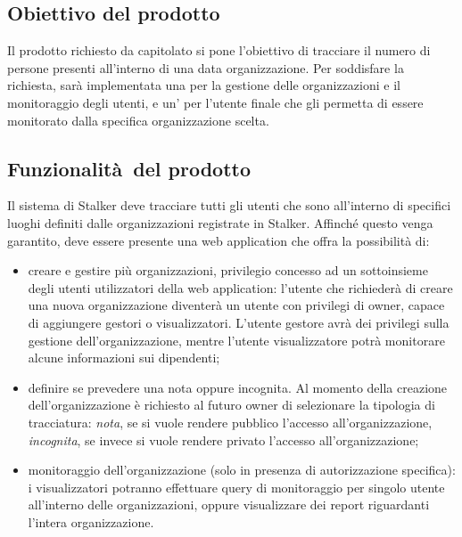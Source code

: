 \documentclass[../manuale-utente.tex]{subfiles}
\begin{document}
\subsection{Obiettivo del prodotto}%
\label{sub:obiettivo_del_prodotto}
Il prodotto richiesto da capitolato si pone l'obiettivo di tracciare il numero di persone presenti all'interno di una data organizzazione. Per soddisfare la richiesta, sarà implementata una  per la gestione delle organizzazioni e il monitoraggio degli utenti, e un' per l'utente finale che gli permetta di essere monitorato dalla specifica organizzazione scelta.


\subsection{Funzionalità del prodotto}%
\label{sub:funzionalita_del_prodotto}
Il sistema di Stalker deve tracciare tutti gli utenti che sono all'interno di specifici luoghi definiti dalle organizzazioni registrate in Stalker.
Affinché questo venga garantito, deve essere presente una web application che offra la possibilità di:
\begin{itemize}
  \item creare e gestire più organizzazioni, privilegio concesso ad un sottoinsieme degli utenti utilizzatori della web application: l'utente che richiederà di creare una nuova organizzazione diventerà un utente con privilegi di owner, capace di aggiungere gestori o visualizzatori. L'utente gestore avrà dei privilegi sulla gestione dell'organizzazione, mentre l'utente visualizzatore potrà monitorare alcune informazioni sui dipendenti;
  \item definire se prevedere una  nota oppure incognita. Al momento della creazione dell'organizzazione è richiesto al futuro owner di selezionare la tipologia di tracciatura: \textit{nota}, se si vuole rendere pubblico l'accesso all'organizzazione, \textit{incognita}, se invece si vuole rendere privato l'accesso all'organizzazione;
  \item monitoraggio dell'organizzazione (solo in presenza di autorizzazione specifica): i visualizzatori potranno effettuare query di monitoraggio per singolo utente all'interno delle organizzazioni, oppure visualizzare dei report riguardanti l'intera organizzazione.
\end{itemize}
\end{document}
